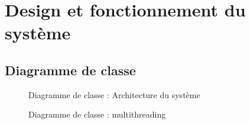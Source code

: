 \documentclass[a4paper,11pt]{report}
\begin{document}
\section{Design et fonctionnement du système}
\subsection{Diagramme de classe}
\begin{figure}[ht]
    \caption{Diagramme de classe : Architecture du système}
\end{figure}
\begin{figure}[ht]
    \caption{Diagramme de classe : multithreading}
\end{figure}
\end{document}
